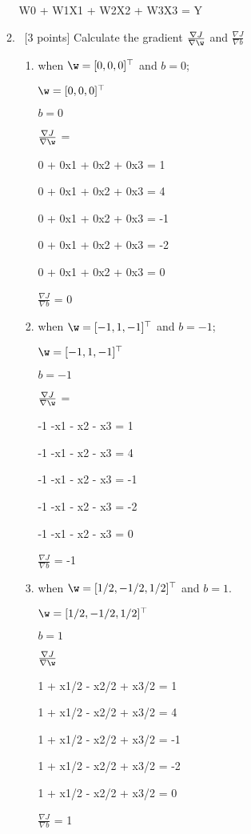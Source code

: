 \documentclass[12pt, fullpage,letterpaper]{article}
\begin{document}
\begin{enumerate}
\begin{enumerate}
W0 + W1X1 + W2X2 + W3X3 = Y


	\item~[3 points] Calculate the gradient $\frac{\nabla J}{\nabla \w}$ and $\frac{\nabla J}{\nabla b}$ 
	\begin{enumerate}
		\item when $\w = [0,0,0]^\top$ and $b = 0$;	\newline

 $\w = [0,0,0]^\top$ 

 $b = 0$

 $\frac{\nabla J}{\nabla \w}$ =

 0 + 0x1 + 0x2 + 0x3 = 1

 0 + 0x1 + 0x2 + 0x3 = 4

 0 + 0x1 + 0x2 + 0x3 = -1

 0 + 0x1 + 0x2 + 0x3 = -2

 0 + 0x1 + 0x2 + 0x3 = 0



 $\frac{\nabla J}{\nabla b}$ = 0

		\item when $\w = [-1,1,-1]^\top$ and $b = -1$; \newline

 $\w =  [-1,1,-1]^\top$ 

 $b = -1$

 $\frac{\nabla J}{\nabla \w}$  =

-1 -x1 - x2 - x3 = 1

-1 -x1 - x2 - x3 = 4

-1 -x1 - x2 - x3 = -1

-1 -x1 - x2 - x3 = -2

-1 -x1 - x2 - x3 = 0

 $\frac{\nabla J}{\nabla b}$ = -1

		\item when $\w = [1/2,-1/2,1/2]^\top$ and $b = 1$. \newline

 $\w =  [1/2,-1/2,1/2]^\top$ 

 $b = 1$

 $\frac{\nabla J}{\nabla \w}$ 

1 + x1/2 - x2/2 + x3/2 = 1

1 + x1/2 - x2/2 + x3/2 = 4

1 + x1/2 - x2/2 + x3/2 = -1

1 + x1/2 - x2/2 + x3/2 = -2

1 + x1/2 - x2/2 + x3/2 = 0

 $\frac{\nabla J}{\nabla b}$ = 1


\end{enumerate}
\end{enumerate}
\end{enumerate}
\end{document}
